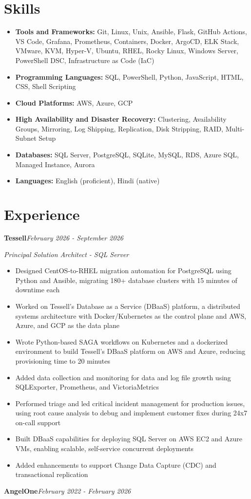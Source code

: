 \documentclass[10pt,a4paper]{article}
\begin{document}
\section{Skills}
\begin{itemize}
  \item \textbf{Tools and Frameworks:} Git, Linux, Unix, Ansible, Flask, GitHub Actions, VS Code, Grafana, Prometheus, Containers, Docker, ArgoCD, ELK Stack, VMware, KVM, Hyper-V, Ubuntu, RHEL, Rocky Linux, Windows Server, PowerShell DSC, Infrastructure as Code (IaC)
  \item \textbf{Programming Languages:} SQL, PowerShell, Python, JavaScript, HTML, CSS, Shell Scripting
  \item \textbf{Cloud Platforms:} AWS, Azure, GCP
  \item \textbf{High Availability and Disaster Recovery:} Clustering, Availability Groups, Mirroring, Log Shipping, Replication, Disk Stripping, RAID, Multi-Subnet Setup
  \item \textbf{Databases:} SQL Server, PostgreSQL, SQLite, MySQL, RDS, Azure SQL, Managed Instance, Aurora
  \item \textbf{Languages:} English (proficient), Hindi (native)
\end{itemize}

\section{Experience}

\noindent\textbf{Tessell}\hfill \textit{February 2026 - September 2026}

\textit{Principal Solution Architect - SQL Server}\\[-5pt]
\begin{itemize}
  \item Designed CentOS-to-RHEL migration automation for PostgreSQL using Python and Ansible, migrating 180+ database clusters with 15 minutes of downtime each
  \item Worked on Tessell's Database as a Service (DBaaS) platform, a distributed systems architecture with Docker/Kubernetes as the control plane and AWS, Azure, and GCP as the data plane
  \item Wrote Python-based SAGA workflows on Kubernetes and a dockerized environment to build Tessell's DBaaS platform on AWS and Azure, reducing provisioning time to 20 minutes
  \item Added data collection and monitoring for data and log file growth using SQLExporter, Prometheus, and VictoriaMetrics
  \item Performed triage and led critical incident management for production issues, using root cause analysis to debug and implement customer fixes during 24x7 on-call support
  \item Built DBaaS capabilities for deploying SQL Server on AWS EC2 and Azure VMs, enabling scalable, self-service concurrent deployments
  \item Added enhancements to support Change Data Capture (CDC) and transactional replication
\end{itemize}
\vspace{14.7pt}
\noindent\textbf{AngelOne}\hfill \textit{February 2022 - February 2026}
\end{document}
